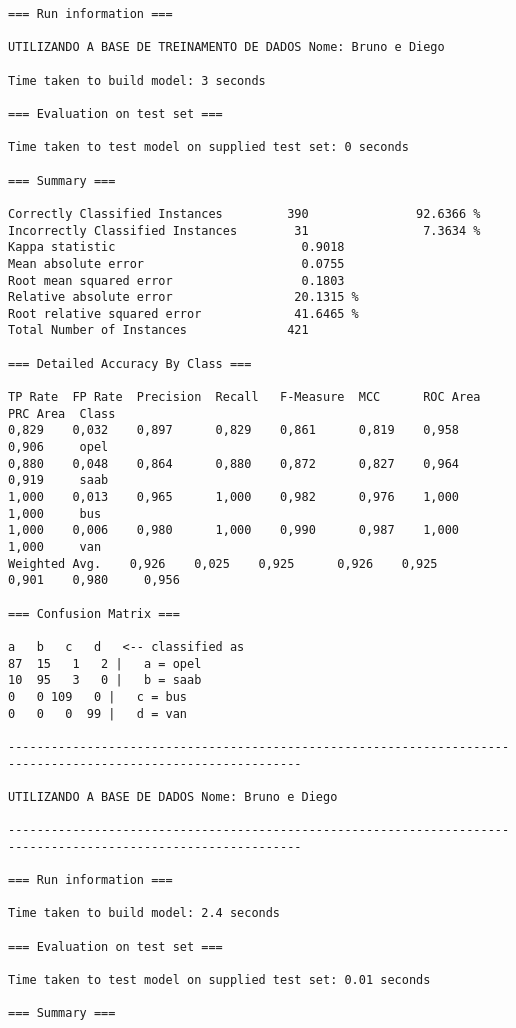 \documentclass[
	article,			%
	11pt,				%
	oneside,			%
	a4paper,			%
	english,			%
	brazil,				%
	sumario=tradicional
	]{abntex2}
\begin{document}
\begin{lstlisting}
=== Run information ===

UTILIZANDO A BASE DE TREINAMENTO DE DADOS Nome: Bruno e Diego

Time taken to build model: 3 seconds

=== Evaluation on test set ===

Time taken to test model on supplied test set: 0 seconds

=== Summary ===

Correctly Classified Instances         390               92.6366 %
Incorrectly Classified Instances        31                7.3634 %
Kappa statistic                          0.9018
Mean absolute error                      0.0755
Root mean squared error                  0.1803
Relative absolute error                 20.1315 %
Root relative squared error             41.6465 %
Total Number of Instances              421     

=== Detailed Accuracy By Class ===

TP Rate  FP Rate  Precision  Recall   F-Measure  MCC      ROC Area  PRC Area  Class
0,829    0,032    0,897      0,829    0,861      0,819    0,958     0,906     opel
0,880    0,048    0,864      0,880    0,872      0,827    0,964     0,919     saab
1,000    0,013    0,965      1,000    0,982      0,976    1,000     1,000     bus
1,000    0,006    0,980      1,000    0,990      0,987    1,000     1,000     van
Weighted Avg.    0,926    0,025    0,925      0,926    0,925      0,901    0,980     0,956     

=== Confusion Matrix ===

a   b   c   d   <-- classified as
87  15   1   2 |   a = opel
10  95   3   0 |   b = saab
0   0 109   0 |   c = bus
0   0   0  99 |   d = van

---------------------------------------------------------------------------------------------------------------

UTILIZANDO A BASE DE DADOS Nome: Bruno e Diego

---------------------------------------------------------------------------------------------------------------

=== Run information ===

Time taken to build model: 2.4 seconds

=== Evaluation on test set ===

Time taken to test model on supplied test set: 0.01 seconds

=== Summary ===


\end{lstlisting}
\end{document}
